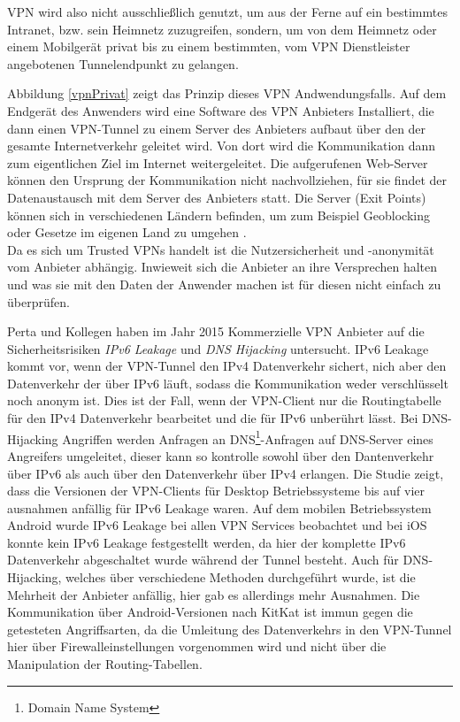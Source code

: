 VPN wird also nicht ausschließlich genutzt, um aus der Ferne auf ein bestimmtes Intranet, bzw. sein Heimnetz zuzugreifen, sondern, um von dem Heimnetz oder einem Mobilgerät privat bis zu einem bestimmten, vom VPN Dienstleister angebotenen Tunnelendpunkt zu gelangen. 

Abbildung \ref{vpnPrivat} zeigt das Prinzip dieses VPN Andwendungsfalls. Auf dem Endgerät des Anwenders wird eine Software des VPN Anbieters Installiert, die dann einen VPN-Tunnel zu einem Server des Anbieters aufbaut über den der gesamte Internetverkehr geleitet wird. Von dort wird die Kommunikation dann zum eigentlichen Ziel im Internet weitergeleitet. Die aufgerufenen Web-Server können den Ursprung der Kommunikation nicht nachvollziehen, für sie findet der Datenaustausch mit dem Server des Anbieters statt. 
Die Server (Exit Points) können sich in verschiedenen Ländern befinden, um zum Beispiel Geoblocking oder Gesetze im eigenen Land zu umgehen \cite{perta2015glance}. \\

Da es sich um Trusted VPNs handelt ist die Nutzersicherheit und -anonymität vom Anbieter abhängig. Inwieweit sich die Anbieter an ihre Versprechen halten und was sie mit den Daten der Anwender machen ist für diesen nicht einfach zu überprüfen. 


Perta und Kollegen \cite{perta2015glance} haben im Jahr 2015 Kommerzielle VPN Anbieter auf die Sicherheitsrisiken \emph{IPv6 Leakage} und \emph{DNS Hijacking} untersucht. IPv6 Leakage kommt vor, wenn der VPN-Tunnel den  IPv4 Datenverkehr sichert, nich aber den Datenverkehr der über IPv6 läuft, sodass die Kommunikation weder verschlüsselt noch anonym ist. Dies ist der Fall, wenn der VPN-Client nur die Routingtabelle für den IPv4 Datenverkehr bearbeitet und die für IPv6 unberührt lässt. 
 Bei DNS-Hijacking Angriffen werden Anfragen an DNS\footnote{Domain Name System}-Anfragen auf DNS-Server eines Angreifers umgeleitet, dieser kann so kontrolle sowohl über den Dantenverkehr über IPv6 als auch über den Datenverkehr über IPv4 erlangen. 
Die Studie zeigt, dass die Versionen der VPN-Clients für Desktop Betriebssysteme bis auf vier ausnahmen anfällig für IPv6 Leakage waren. Auf dem mobilen Betriebssystem Android wurde IPv6 Leakage bei allen VPN Services beobachtet und bei iOS konnte kein IPv6 Leakage festgestellt werden, da hier der komplette IPv6 Datenverkehr abgeschaltet wurde während der Tunnel besteht. 
Auch für DNS-Hijacking, welches über verschiedene Methoden durchgeführt wurde, ist die Mehrheit der Anbieter anfällig, hier gab es allerdings mehr Ausnahmen. Die Kommunikation über Android-Versionen nach KitKat ist immun gegen die getesteten Angriffsarten, da die Umleitung des Datenverkehrs in den VPN-Tunnel hier über Firewalleinstellungen vorgenommen wird und nicht über die Manipulation der Routing-Tabellen. 


